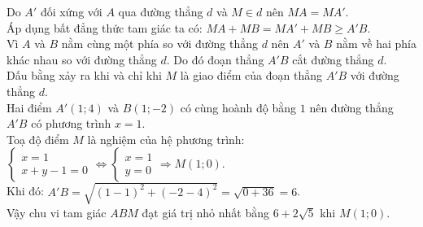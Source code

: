 \begin{bt}
{\begin{enumerate}[a)]
	Do $A'$ đối xứng với $A$ qua đường thẳng $d$ và $M \in d$ nên $MA = MA'$.\\
	Áp dụng bất đẳng thức tam giác ta có:
	$MA + MB = MA' + MB \ge A'B$.\\
	Vì $A$ và $B$ nằm cùng một phía so với đường thẳng $d$ nên $A'$ và $B$ nằm về hai phía khác nhau so với đường thẳng $d$. Do đó đoạn thẳng $A'B$ cắt đường thẳng $d$.\\
	Dấu bằng xảy ra khi và chỉ khi $M$ là giao điểm của đoạn thẳng $A'B$ với đường thẳng $d$.\\
	Hai điểm $A'(1; 4)$ và $B(1; -2)$ có cùng hoành độ bằng $1$ nên đường thẳng $A'B$ có phương trình $x = 1$.\\
	Toạ độ điểm $M$ là nghiệm của hệ phương trình:
	$\begin{cases} x = 1 \\ x + y - 1 = 0 \end{cases} \Leftrightarrow \begin{cases} x = 1 \\ y = 0 \end{cases} \Rightarrow M(1; 0)$.\\
	Khi đó: $A'B = \sqrt{(1 - 1)^2 + (-2 - 4)^2} = \sqrt{0 + 36} = 6$.\\
	Vậy chu vi tam giác $ABM$ đạt giá trị nhỏ nhất bằng $6 + 2\sqrt{5}$ khi $M(1; 0)$.
\end{enumerate}
}
\end{bt}
